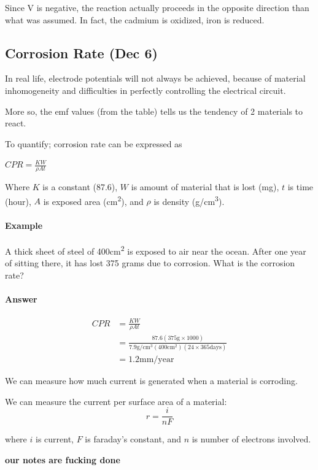 \documentclass{article}
\begin{document}
Since \textDelta V is negative, the reaction actually proceeds in the opposite direction than what was assumed. In fact, the cadmium is oxidized, iron is reduced.

\subsection{Corrosion Rate (Dec 6)}
In real life, electrode potentials will not always be achieved, because of material inhomogeneity and difficulties in perfectly controlling the electrical circuit. 

More so, the emf values (from the table) tells us the tendency of 2 materials to react.

To quantify; corrosion rate can be expressed as 

$CPR = \frac{KW}{\rho At}$

Where $K$ is a constant (87.6), $W$ is amount of material that is lost (mg), $t$ is time (hour), $A$ is exposed area (cm\textsuperscript{2}), and $\rho$ is density (g/cm\textsuperscript{3}).

\paragraph{Example} A thick sheet of steel of 400cm\textsuperscript{2} is exposed to air near the ocean. After one year of sitting there, it has lost 375 grams due to corrosion. What is the corrosion rate?

\paragraph{Answer} 
\begin{align*}
    CPR &= \frac{KW}{\rho At}\\
    &= \frac{87.6(375\si\g \times 1000)}{7.9\si{\g\per\cubic\cm} (400\si{\cm\squared})(24\times365 \text{days})}\\
    &= 1.2\text{mm/year}
\end{align*}

We can measure how much current is generated when a material is corroding.

We can measure the current per surface area of a material:
\[r = \frac{i}{nF}\]

where $i$ is current, $F$ is faraday's constant, and $n$ is number of electrons involved.

\textbf{our notes are fucking done}
\end{document}
